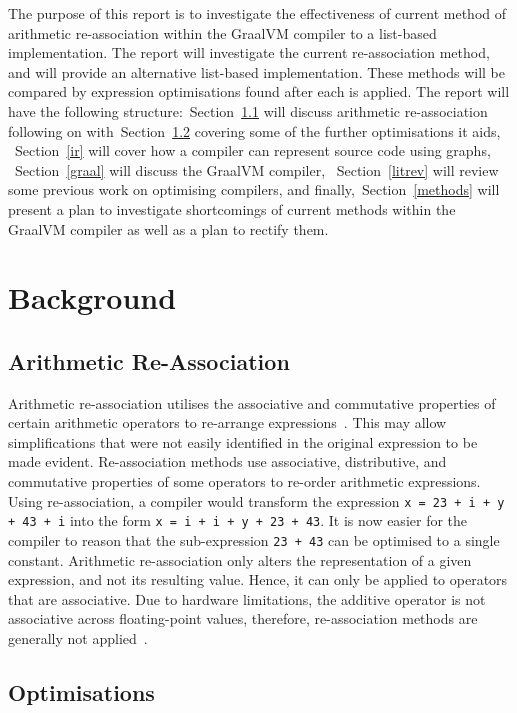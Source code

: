 \documentclass[12pt,openany,a4paper]{book}
\newcommand{\secn}[1] {Section~\ref{#1}}	%
\begin{document}
The purpose of this report is to investigate the effectiveness of current method
of arithmetic re-association within the GraalVM compiler to a list-based
implementation. The report will investigate the current re-association method,
and will provide an alternative list-based implementation. These methods will
be compared by expression optimisations found after each is applied.
The report will have the following structure:~\secn{ara} will discuss
arithmetic re-association following on with~\secn{opt} covering some of the further optimisations it aids,
~\secn{ir} will cover how a compiler can represent source code using graphs,
~\secn{graal} will discuss the GraalVM compiler, ~\secn{litrev} will review some previous work on 
optimising compilers, and finally,~\secn{methods} will present a 
plan to investigate shortcomings of current methods within the GraalVM compiler
as well as a plan to rectify them.

\chapter{Background}
\label{bg}

\section{Arithmetic Re-Association}
\label{ara}

Arithmetic re-association utilises the associative and
commutative properties of certain arithmetic operators to re-arrange expressions~\cite{redund}. 
This may allow simplifications that were not easily identified in the original 
expression to be made evident. Re-association methods use associative,
distributive, and commutative properties of some operators to re-order arithmetic
expressions.
Using re-association, a compiler would transform the expression
\verb|x = 23 + i + y + 43 + i| into the form \verb|x = i + i + y + 23 + 43|. It
is now easier for the compiler to reason that the sub-expression \verb|23 + 43|
can be optimised to a single constant.
Arithmetic re-association only alters the representation of a given expression,
and not its resulting value. Hence, it can only be applied to operators that
are associative. Due to hardware limitations, the additive operator is not
associative across floating-point values, therefore, re-association methods are generally not
applied~\cite{floats}.

\section{Optimisations}
\label{opt}
\end{document}
